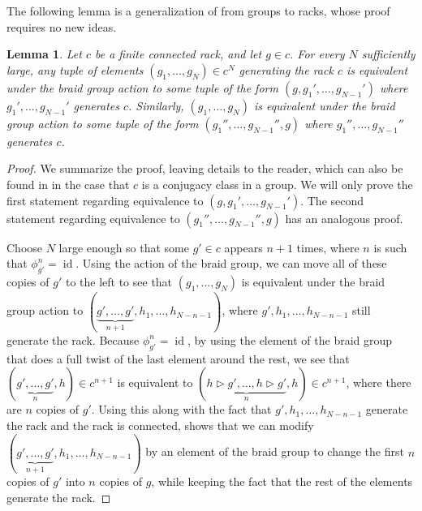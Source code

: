 \documentclass[12 pt]{amsart}
\theoremstyle{plain}
\newtheorem{lemma}[theorem]{Lemma}
\theoremstyle{definition}
\theoremstyle{remark}
\numberwithin{equation}{section}
\DeclareMathOperator\id{id}
\begin{document}
The following lemma is a generalization of \cite[Proposition
3.4]{EllenbergVW:cohenLenstra} from groups to racks, whose proof requires no new
ideas.
\begin{lemma}\label{lemma:evwlemma}
	Let $c$ be a finite connected rack, and let $g \in c$. For every
	$N$ sufficiently large, any tuple of elements $(g_1,\ldots,g_N) \in c^N$
	generating the rack $c$ is equivalent under the braid group action to
	some tuple of the form $(g,g_1',\ldots,g_{N-1}')$ where $g_1',\ldots,g_{N-1}'$ generates $c$.
	Similarly, $(g_1,\ldots,g_N)$ is equivalent under the braid group action
	to some tuple of the form $(g_1'',\ldots,g_{N-1}'',g)$ where
	$g_1'',\ldots,g_{N-1}''$ generates $c$.
\end{lemma}

\begin{proof}
	We summarize the proof, leaving details to the reader, which can also be found in \cite[Proposition
	3.4]{EllenbergVW:cohenLenstra} in the case that $c$ is a conjugacy class in a
	group.
	We will only prove the first statement regarding equivalence to
	$(g,g_1',\ldots,g_{N-1}')$. The second statement regarding
	equivalence to $(g_1'',\ldots,g_{N-1}'',g)$ has an analogous proof.

	
	Choose $N$ large enough so that some $g' \in c$ appears $n+1$ times,
	where $n$ is such that $\phi_{g'}^n=\id$. Using the action of the braid
	group, we can move all of these copies of $g'$ to the left to see that
	$(g_1,\ldots,g_N)$ is equivalent under the braid group action to
	$(\underbrace{g',\ldots,g'}_{n+1},h_1,\ldots,h_{N-n-1})$, where $g',h_1, \ldots, h_{N-n-1}$
	still generate the rack. Because $\phi_{g'}^n=\id$, by using the element
	of the braid group that does a full twist of the last element around the
	rest, we see that $(\underbrace{g',\ldots,g'}_n,h) \in c^{n+1}$ is equivalent to
	$(\underbrace{h\triangleright g',\ldots,h\triangleright g'}_n,h) \in
	c^{n+1}$, where there are $n$ copies of $g'$. Using this along with the
	fact that $g',h_1,\ldots,h_{N-n-1}$ generate the rack and the rack is connected,
	shows that we can modify $(\underbrace{g',\ldots,g'}_{n+1},h_1,\ldots,h_{N-n-1})$ by an element of the braid group to change the first $n$ copies of $g'$ into $n$ copies of $g$, while keeping the fact that the rest of the elements generate the rack.
\end{proof}
\end{document}
